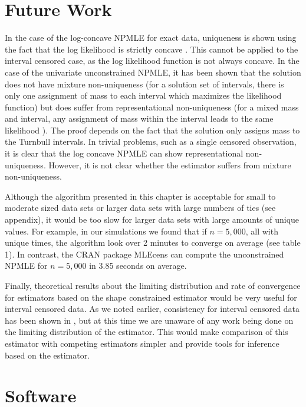 	{\section{Future Work} 
	\label{sec:future}	}
	In the case of the log-concave NPMLE for exact data, uniqueness is shown using the fact that the log likelihood is strictly concave \cite{RefRuf2007}. This cannot be applied to the interval censored case, as the log likelihood function is not always concave. In the case of the univariate unconstrained NPMLE, it has been shown that the solution does not have mixture non-uniqueness (for a solution set of intervals, there is only one assignment of mass to each interval which maximizes the likelihood function) but does suffer from representational non-uniqueness (for a mixed mass and interval, any assignment of mass within the interval leads to the same likelihood \cite{RefGV2001}). The proof depends on the fact that the solution only assigns mass to the Turnbull intervals. In trivial problems, such as a single censored observation, it is clear that the log concave NPMLE can show representational non-uniqueness. However, it is not clear whether the estimator suffers from mixture non-uniqueness. 
	
	Although the algorithm presented in this chapter is acceptable for small to moderate sized data sets or larger data sets with large numbers of ties (see appendix), it would be too slow for larger data sets with large amounts of unique values. For example, in our simulations we found that if $n = 5,000$, all with unique times, the algorithm look over 2 minutes to converge on average (see table 1). In contrast, the CRAN package MLEcens can compute the unconstrained NPMLE for $ n = 5,000$ in 3.85 seconds on average. 
	
	Finally, theoretical results about the limiting distribution and rate of convergence for estimators based on the shape constrained estimator would be very useful for interval censored data. As we noted earlier, consistency for interval censored data has been shown in \cite{RefDea2014}, but at this time we are unaware of any work being done on the limiting distribution of the estimator. This would make comparison of this estimator with competing estimators simpler and provide tools for inference based on the estimator. 
\\			

	{\section{Software}
	\label{sec:software}	}
	
